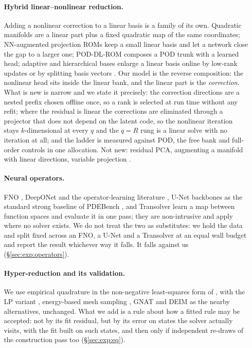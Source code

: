 \paragraph{Hybrid linear--nonlinear reduction.}
Adding a nonlinear correction to a linear basis is a family of its own.
Quadratic manifolds \citep{GeelenWrightWillcox2022,BarnettFarhat2022} are a
linear part plus a fixed quadratic map of the same coordinates;
NN-augmented projection ROMs \citep{BarnettFarhatMaday2023} keep a small linear
basis and let a network close the gap to a larger one; POD-DL-ROM
\citep{FrescaManzoni2022PODDLROM} composes a POD trunk with a learned head;
adaptive and hierarchical bases enlarge a linear basis online by low-rank
updates \citep{PeherstorferWillcox2015Adaptive} or by splitting basis vectors
\citep{Carlberg2015hRefinement}. Our model is the reverse composition: the
nonlinear head sits inside the linear bank, and the linear part is the
\emph{correction}. What is new is narrow and we state it precisely: the
correction directions are a nested prefix chosen offline once, so a rank is
selected at run time without any refit; where the residual is linear the
corrections are eliminated through a projector that does not depend on the
latent code, so the nonlinear iteration stays $k$-dimensional at every $q$ and
the $q=R$ rung is a linear solve with no iteration at all; and the ladder is
measured against POD, the free bank and full-order controls in one allocation.
Not new: residual PCA, augmenting a manifold with linear directions, variable
projection \citep{GolubPereyra1973}.

\paragraph{Neural operators.}
FNO \citep{Li2020FNO}, DeepONet \citep{Lu2021DeepONet} and the operator-learning
literature \citep{Kovachki2023NeuralOperator}, U-Net backbones
\citep{Ronneberger2015UNet} as the standard strong baseline of PDEBench
\citep{Takamoto2022PDEBench}, and Transolver \citep{Wu2024Transolver} learn a
map between function spaces and evaluate it in one pass; they are non-intrusive
and apply where no solver exists. We do not treat the two as substitutes: we
hold the data and split fixed across an FNO, a U-Net and a Transolver at an
equal wall budget and report the result whichever way it falls. It falls
against us (\S\ref{sec:exp:operators}).

\paragraph{Hyper-reduction and its validation.}
We use empirical quadrature in the non-negative least-squares form of
\citet{Hernandez2017EQ}, with the LP variant \citep{YanoPatera2019LPEQ},
energy-based mesh sampling \citep{FarhatECSW2014,Chapman2017AcceleratedECSW},
GNAT \citep{Carlberg2013GNAT} and DEIM \citep{ChaturantabutSorensen2010} as
the nearby alternatives, unchanged. What we add is a rule about how a fitted
rule may be accepted: not by its fit residual, but by its error on states the
solver actually visits, with the fit built on such states, and then only if
independent re-draws of the construction pass too (\S\ref{sec:exp:eq}).

